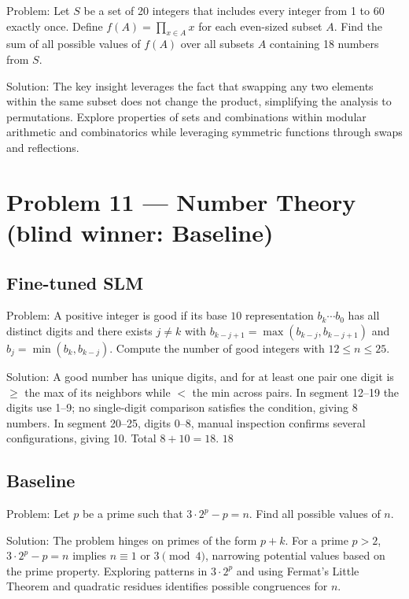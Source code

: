 \documentclass[11pt]{article}
\begin{document}
Problem:
Let $S$ be a set of 20 integers that includes every integer from 1 to 60 exactly once. Define $f(A)=\prod_{x\in A}x$ for each even-sized subset $A$. Find the sum of all possible values of $f(A)$ over all subsets $A$ containing 18 numbers from $S$.

Solution:
The key insight leverages the fact that swapping any two elements within the same subset does not change the product, simplifying the analysis to permutations. Explore properties of sets and combinations within modular arithmetic and combinatorics while leveraging symmetric functions through swaps and reflections.

\section*{Problem 11 --- Number Theory \quad(blind winner: Baseline)}

\subsection*{Fine-tuned SLM}

Problem:
A positive integer is good if its base $10$ representation $b_k\cdots b_0$ has all distinct digits and there exists $j\neq k$ with $b_{k-j+1}=\max(b_{k-j},b_{k-j+1})$ and $b_j=\min(b_k,b_{k-j})$. Compute the number of good integers with $12\le n\le 25$.

Solution:
A good number has unique digits, and for at least one pair one digit is $\ge$ the max of its neighbors while $<$ the min across pairs. In segment 12--19 the digits use 1--9; no single-digit comparison satisfies the condition, giving 8 numbers. In segment 20--25, digits 0--8, manual inspection confirms several configurations, giving 10. Total $8+10=18$. $\boxed{18}$

\subsection*{Baseline}

Problem:
Let $p$ be a prime such that $3 \cdot 2^p - p = n$. Find all possible values of $n$.

Solution:
The problem hinges on primes of the form $p+k$. For a prime $p>2$, $3\cdot2^p - p = n$ implies $n \equiv 1$ or $3 \pmod 4$, narrowing potential values based on the prime property. Exploring patterns in $3\cdot 2^p$ and using Fermat's Little Theorem and quadratic residues identifies possible congruences for $n$.
\end{document}
